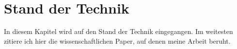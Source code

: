 \chapter{Stand der Technik}

In diesem Kapitel wird auf den Stand der Technik eingegangen. Im weitesten zitiere ich hier die wissenschaftlichen Paper, auf denen meine Arbeit beruht.